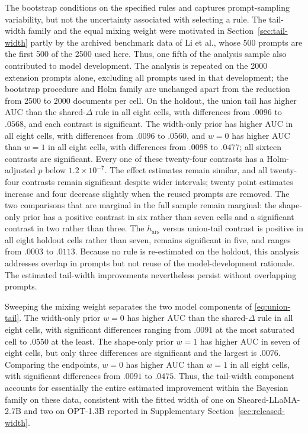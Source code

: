 \documentclass[11pt]{article}
\begin{document}
The bootstrap conditions on the specified rules and captures prompt-sampling variability, but not the uncertainty associated with selecting a rule.  The tail-width family and the equal mixing weight were motivated in Section~\ref{sec:tail-width} partly by the archived benchmark data of Li et al., whose 500 prompts are the first 500 of the 2500 used here.  Thus, one fifth of the analysis sample also contributed to model development.  The analysis is repeated on the 2000 extension prompts alone, excluding all prompts used in that development; the bootstrap procedure and Holm family are unchanged apart from the reduction from 2500 to 2000 documents per cell.   On the holdout, the union tail has higher AUC than the shared-$\Delta$ rule in all eight cells, with differences from $.0096$ to $.0568$, and each contrast is significant.  The width-only prior has higher AUC in all eight cells, with differences from $.0096$ to $.0560$, and $w=0$ has higher AUC than $w=1$ in all eight cells, with differences from $.0098$ to $.0477$; all sixteen contrasts are significant.  Every one of these twenty-four contrasts has a Holm-adjusted $p$ below $1.2\times10^{-7}$.  The effect estimates remain similar, and all twenty-four contrasts remain significant despite wider intervals; twenty point estimates increase and four decrease slightly when the reused prompts are removed.  The two comparisons that are marginal in the full sample remain marginal: the shape-only prior has a positive contrast in six rather than seven cells and a significant contrast in two rather than three.  The $h_{\mathrm{ars}}$ versus union-tail contrast is positive in all eight holdout cells rather than seven, remains significant in five, and ranges from $.0003$ to $.0113$.  Because no rule is re-estimated on the holdout, this analysis addresses overlap in prompts but not reuse of the model-development rationale.  The estimated tail-width improvements nevertheless persist without overlapping prompts.

Sweeping the mixing weight separates the two model components of \eqref{eq:union-tail}.  The width-only prior $w=0$ has higher AUC than the shared-$\Delta$ rule in all eight cells, with significant differences ranging from $.0091$ at the most saturated cell to $.0550$ at the least.  The shape-only prior $w=1$ has higher AUC in seven of eight cells, but only three differences are significant and the largest is $.0076$.  Comparing the endpoints, $w=0$ has higher AUC than $w=1$ in all eight cells, with significant differences from $.0091$ to $.0475$.  Thus, the tail-width component accounts for essentially the entire estimated improvement within the Bayesian family on these data, consistent with the fitted width of one on Sheared-LLaMA-2.7B and two on OPT-1.3B reported in Supplementary Section~\ref{sec:released-width}.
\end{document}

